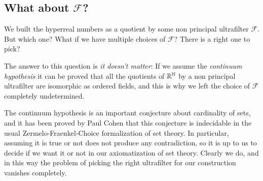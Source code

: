 \documentclass[adraft, copyright,creativecommons,sharealike,noncommercial]{Preambles/eptcs}
\begin{document}
\subsection{What about $\mathcal{F}$?}
We built the hyperreal numbers as a quotient by some non principal ultrafilter $\mathcal{F}$. But which one? What if we have multiple choices of $\mathcal{F}$? There is a right one to pick?

The answer to this question is \emph{it doesn't matter}: If we assume the \emph{continuum hypothesis} it can be proved that all the quotients of $\mathbb{R}^{\mathbb{N}}$ by a non principal ultrafilter are isomorphic as ordered fields, and this is why we left the choice of $\mathcal{F}$ completely undetermined.

The continuum hypothesis is an important conjecture about cardinality of sets, and it has been proved by Paul Cohen that this conjecture is indecidable in the usual Zermelo-Fraenkel-Choice formalization of set theory. In particular, assuming it is true or not does not produce any contradiction, so it is up to us to decide if we want it or not in our axiomatization of set theory. Clearly we do, and in this way the problem of picking the right ultrafilter for our construction vanishes completely.
\end{document}
